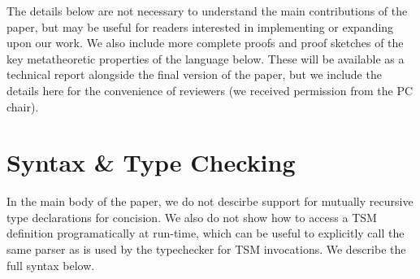 \documentclass{sig-alternate}[10pt]
\begin{document}


%

%
%
\newpage
\onecolumn
\appendix
The details below are not necessary to understand the main contributions of the paper, but may be useful for readers interested in implementing or expanding upon our work. We also include more complete proofs and proof sketches of the key metatheoretic properties of the language below. These will be available as a technical report alongside the final version of the paper, but we include the details here for the convenience of reviewers (we received permission from the PC chair).

\section{Syntax \& Type Checking}
In the main body of the paper, we do not descirbe support for mutually recursive type declarations for concision. We also do not show how to access a TSM definition programatically at run-time, which can be useful to explicitly call the same parser as is used by the typechecker for TSM invocations. We describe the full syntax below.
\end{document}
